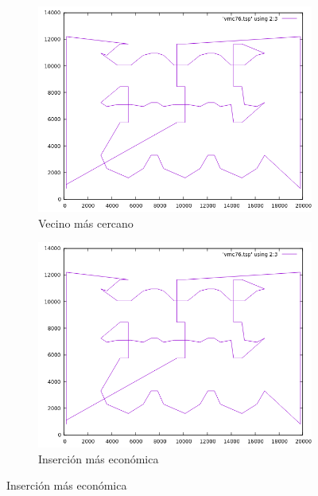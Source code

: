 \documentclass[12pt,spanish]{article}
\begin{document}
\begin{figure}[H]
\centering
\begin{subfigure}[b]{0.36\textwidth}
\includegraphics[width=\textwidth]{pr76_vmc.png}
\caption{Vecino más cercano}
\end{subfigure}
\quad
\begin{subfigure}[b]{0.36\textwidth}
\includegraphics[width=\textwidth]{pr76_vmc.png}
\caption{Inserción más económica}
\end{subfigure}

\vspace{1cm}


\end{figure}
\end{document}
